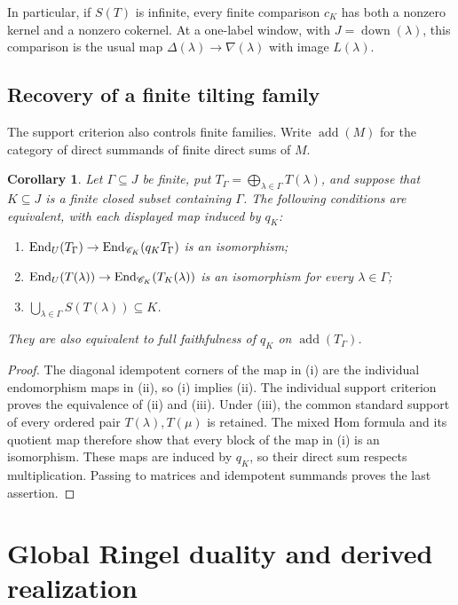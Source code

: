 \documentclass[11pt,reqno]{amsart}
\newcommand{\add}{\operatorname{add}}\newcommand{\im}{\operatorname{im}}\newcommand{\coker}{\operatorname{coker}}\newcommand{\rad}{\operatorname{rad}}
\newtheorem{corollary}[theorem]{Corollary}
\theoremstyle{definition}
\theoremstyle{remark}
\numberwithin{equation}{section}
\begin{document}
In particular, if $S(T)$ is infinite, every finite comparison $c_K$
has both a nonzero kernel and a nonzero cokernel. At a one-label
window, with $J=\operatorname{down}(\lambda)$, this comparison is the
usual map $\Delta(\lambda)\to\nabla(\lambda)$ with image $L(\lambda)$.

\subsection{Recovery of a finite tilting family}
The support criterion also controls finite families. Write $\add(M)$
for the category of direct summands of finite direct sums of $M$.

\begin{corollary}\label{cor:family-quotient}
Let $\Gamma\subseteq J$ be finite, put
$T_\Gamma=\bigoplus_{\lambda\in\Gamma}T(\lambda)$, and suppose that
$K\subseteq J$ is a finite closed subset containing $\Gamma$. The following
conditions are equivalent, with each displayed map induced by $q_K$:
\begin{enumerate}
\item $\operatorname{End}_U(T_\Gamma)\to\operatorname{End}_{\mathscr C_K}(q_KT_\Gamma)$ is an isomorphism;
\item $\operatorname{End}_U(T(\lambda))\to\operatorname{End}_{\mathscr C_K}(T_K(\lambda))$ is an
isomorphism for every $\lambda\in\Gamma$;
\item $\bigcup_{\lambda\in\Gamma}S(T(\lambda))\subseteq K$.
\end{enumerate}
They are also equivalent to full faithfulness of $q_K$ on
$\add(T_\Gamma)$.
\end{corollary}
\begin{proof}
The diagonal idempotent corners of the map in (i) are the individual
endomorphism maps in (ii), so (i) implies (ii).
The individual support criterion proves the equivalence of (ii) and
(iii). Under (iii), the common standard support of every ordered pair
$T(\lambda),T(\mu)$ is retained. The mixed Hom formula and its quotient
map therefore show that every block of the map in (i) is an
isomorphism. These maps are induced by $q_K$, so their
direct sum respects multiplication. Passing to matrices and idempotent
summands proves the last assertion.
\end{proof}


\section{Global Ringel duality and derived realization}\label{sec:ringel}
\end{document}

